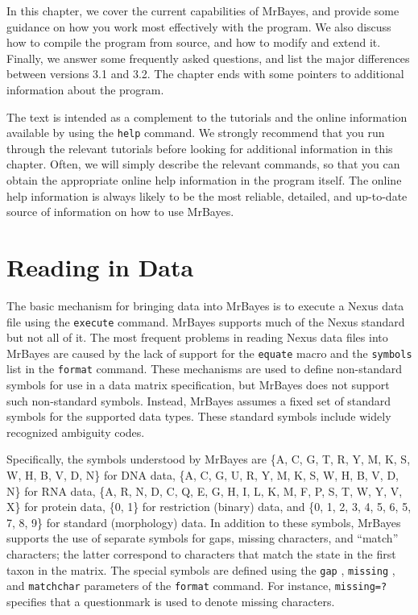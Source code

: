 \documentclass[12pt]{book}
\newcommand{\ttt}[1]{\texttt{#1} }
\begin{document}
In this chapter, we cover the current capabilities of MrBayes, and provide some guidance on how you
work most effectively with the program. We also discuss how to compile the program from source, and
how to modify and extend it. Finally, we answer some frequently asked questions, and list the major
differences between versions 3.1 and 3.2. The chapter ends with some pointers to additional
information about the program.

The text is intended as a complement to the tutorials and the online information available by using
the \ttt{help} command. We strongly recommend that you run through the relevant tutorials before
looking for additional information in this chapter. Often, we will simply describe the relevant
commands, so that you can obtain the appropriate online help information in the program itself. The
online help information is always likely to be the most reliable, detailed, and up-to-date source
of information on how to use MrBayes. 

\section{Reading in Data}
The basic mechanism for bringing data into MrBayes is to execute a Nexus data file using the
\ttt{execute} command. MrBayes supports much of the Nexus standard \citep{Maddison97} but not all
of it. The most frequent problems in reading Nexus data files into MrBayes are caused by the lack
of support for the \ttt{equate} macro and the \ttt{symbols} list in the \ttt{format} command. These
mechanisms are used to define non-standard symbols for use in a data matrix specification, but
MrBayes does not support such non-standard symbols. Instead, MrBayes assumes a fixed set of
standard symbols for the supported data types. These standard symbols include widely recognized
ambiguity codes.

Specifically, the symbols understood by MrBayes are  \{A, C, G, T, R, Y, M, K, S, W, H, B, V, D,
N\} for DNA data, \{A, C, G, U, R, Y, M, K, S, W, H, B, V, D, N\} for RNA data, \{A, R, N, D, C, Q,
E, G, H, I, L, K, M, F, P, S, T, W, Y, V, X\} for protein data, \{0, 1\} for restriction (binary)
data, and \{0, 1, 2, 3, 4, 5, 6, 5, 7, 8, 9\} for standard (morphology) data. In addition to these
symbols, MrBayes supports the use of separate symbols for gaps, missing characters, and ``match''
characters; the latter correspond to characters that match the state in the first taxon in the
matrix. The special symbols are defined using the \ttt{gap}, \ttt{missing}, and
\ttt{matchchar} parameters of the \ttt{format} command. For instance, \ttt{missing=?} specifies
that a questionmark is used to denote missing characters.
 
\end{document}
